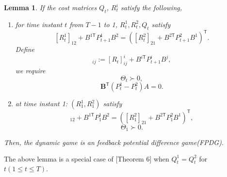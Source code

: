\documentclass[letterpaper, 10 pt, conference]{ieeeconf}  %
\newcommand{\transpose}{\mathsf{T}}
\newtheorem{lemma}{Lemma}
\begin{document}
\begin{lemma}
    If the cost matrices $Q_{t}$, $R_{t}^{i}$ satisfy the following,
    \begin{enumerate}
        \item for time instant $t$ from $T-1$ to 1, $R_{t}^{1},R_{t}^{2},Q_{t}$ satisfy
        \begin{equation}\label{eq:costFPDG1}
            [R_{t}^{1}]_{12} + B^{1\transpose}P_{t+1}^{1}B^{2} = ([R_{t}^{2}]_{21} + B^{2\transpose}P_{t+1}^{2}B^{1})^{\transpose}.
        \end{equation}
        Define
        \begin{equation}
        [\Theta_{t}]_{ij} := [R_{t}]^{i}_{ij} + B^{i\transpose}P_{t+1}^{i}B^{j},
        \end{equation}
        we require
        \begin{equation}
            \Theta_{t} \succ 0,
        \end{equation}
        \begin{equation*}
            \mathbf{B}^{\transpose}(P_{t}^{1}-P_{t}^{2})A=0.
        \end{equation*}
        \item at time instant 1: $(R_{1}^{1},R_{1}^{2})$ satisfy
        \begin{equation}
            [R_{1}^{1}]_{12} + B^{1\transpose}P_{1}^{1}B^{2} = ([R_{1}^{2}]_{21} + B^{2\transpose}P_{1}^{2}B^{1})^{\transpose},
        \end{equation}
        \begin{equation}\label{eq:costFPDG2}
            \Theta_{1} \succ 0.
        \end{equation}
    \end{enumerate}
    Then, the dynamic game is an feedback potential difference game(FPDG).
\end{lemma}
The above lemma is a special case of \cite{}[Theorem 6] when $Q_{t}^{1}=Q_{t}^{2}$ for $t(1\leq t \leq T)$.
\end{document}
